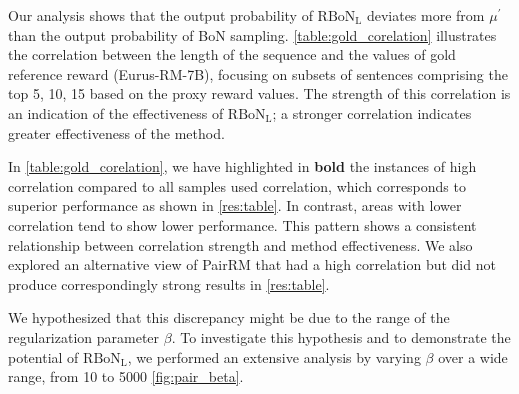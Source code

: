 \newpage
Our analysis shows that the output probability of $\mathrm{RBoN}_{\mathrm{L}}$ deviates more from $\mu^\prime$ than the output probability of BoN sampling. \cref{table:gold_corelation} illustrates the correlation between the length of the sequence and the values of gold reference reward (Eurus-RM-7B), focusing on subsets of sentences comprising the top {5, 10, 15} based on the proxy reward values. The strength of this correlation is an indication of the effectiveness of $\mathrm{RBoN}_{\mathrm{L}}$; a stronger correlation indicates greater effectiveness of the method.

In \cref{table:gold_corelation}, we have highlighted in \textbf{bold} the instances of high correlation compared to all samples used correlation, which corresponds to superior performance as shown in \cref{res:table}. In contrast, areas with lower correlation tend to show lower performance. This pattern shows a consistent relationship between correlation strength and method effectiveness. We also explored an alternative view of PairRM that had a high correlation but did not produce correspondingly strong results in \cref{res:table}. 

We hypothesized that this discrepancy might be due to the range of the regularization parameter $\beta$. To investigate this hypothesis and to demonstrate the potential of $\mathrm{RBoN}_{\mathrm{L}}$, we performed an extensive analysis by varying $\beta$ over a wide range, from 10 to 5000 \cref{fig:pair_beta}.


